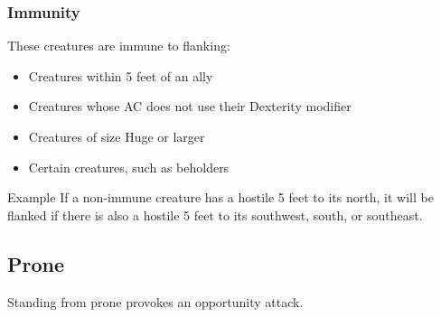 \documentclass[House_Rules.tex]{subfiles}
\begin{document}
\subsubsection{Immunity}
These creatures are immune to flanking:
\begin{itemize}
    \item Creatures within 5 feet of an ally
    \item Creatures whose AC does not use their Dexterity modifier
    \item Creatures of size Huge or larger
    \item Certain creatures, such as beholders
\end{itemize}

\begin{DndComment}{Example}
If a non-immune creature has a hostile 5 feet to its north, it will be flanked if there is also a hostile 5 feet to its southwest, south, or southeast.
\end{DndComment}

\subsection{Prone}
Standing from prone provokes an opportunity attack.
\end{document}
